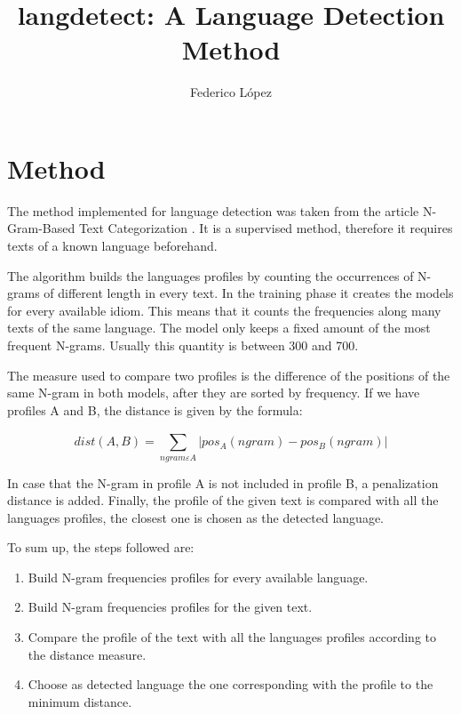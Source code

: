 \documentclass{llncs}
\begin{document}
\frontmatter

\title{langdetect: A Language Detection Method}

\author{Federico López}

\maketitle

\section{Method}
The method implemented for language detection was taken from the article N-Gram-Based Text Categorization \cite{n-gram-basedtext}. It is a supervised method, therefore it requires texts of a known language beforehand.

The algorithm builds the languages profiles by counting the occurrences of N-grams of different length in every text. In the training phase it creates the models for every available idiom. This means that it counts the frequencies along many texts of the same language. The model only keeps a fixed amount of the most frequent N-grams. Usually this quantity is between 300 and 700. 

The measure used to compare two profiles is the difference of the positions of the same N-gram in both models, after they are sorted by frequency. If we have profiles A and B, the distance is given by the formula:

\begin{equation}
dist(A,B) = \sum_{ngram \varepsilon A}^{} | pos_{A}(ngram) - pos_{B}(ngram) | 
\end{equation}

In case that the N-gram in profile A is not included in profile B, a penalization distance is added.
Finally, the profile of the given text is compared with all the languages profiles, the closest one is chosen as the detected language.

To sum up, the steps followed are:
\begin{enumerate}
	\item Build N-gram frequencies profiles for every available language.
	\item Build N-gram frequencies profiles for the given text.
	\item Compare the profile of the text with all the languages profiles according to the distance measure.
	\item Choose as detected language the one corresponding with the profile to the minimum distance.
\end{enumerate}
\end{document}
